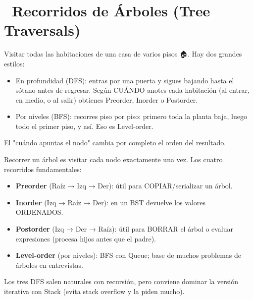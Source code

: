 \chapter[\emj{🌿}~Recorridos de Árboles (Tree Traversals)]{~Recorridos de Árboles (Tree Traversals)}

\begin{dsaquees}

Visitar todas las habitaciones de una casa de varios pisos 🏠. Hay dos
grandes estilos:

\begin{itemize}
\item En profundidad (DFS): entras por una puerta y sigues bajando hasta
      el sótano antes de regresar. Según CUÁNDO anotes cada habitación
      (al entrar, en medio, o al salir) obtienes Preorder, Inorder o
      Postorder.
\item Por niveles (BFS): recorres piso por piso: primero toda la planta
      baja, luego todo el primer piso, y así. Eso es Level-order.
\end{itemize}

El "cuándo apuntas el nodo" cambia por completo el orden del resultado.

\end{dsaquees}

\begin{dsaotraforma}

Recorrer un árbol es visitar cada nodo exactamente una vez. Los cuatro
recorridos fundamentales:

\begin{itemize}
\item \textbf{Preorder} (Raíz → Izq → Der): útil para COPIAR/serializar
      un árbol.
\item \textbf{Inorder} (Izq → Raíz → Der): en un BST devuelve los
      valores ORDENADOS.
\item \textbf{Postorder} (Izq → Der → Raíz): útil para BORRAR el árbol o
      evaluar expresiones (procesa hijos antes que el padre).
\item \textbf{Level-order} (por niveles): BFS con Queue; base de muchos
      problemas de árboles en entrevistas.
\end{itemize}

Los tres DFS salen naturales con recursión, pero conviene dominar la
versión iterativa con Stack (evita stack overflow y la piden mucho).

\end{dsaotraforma}

